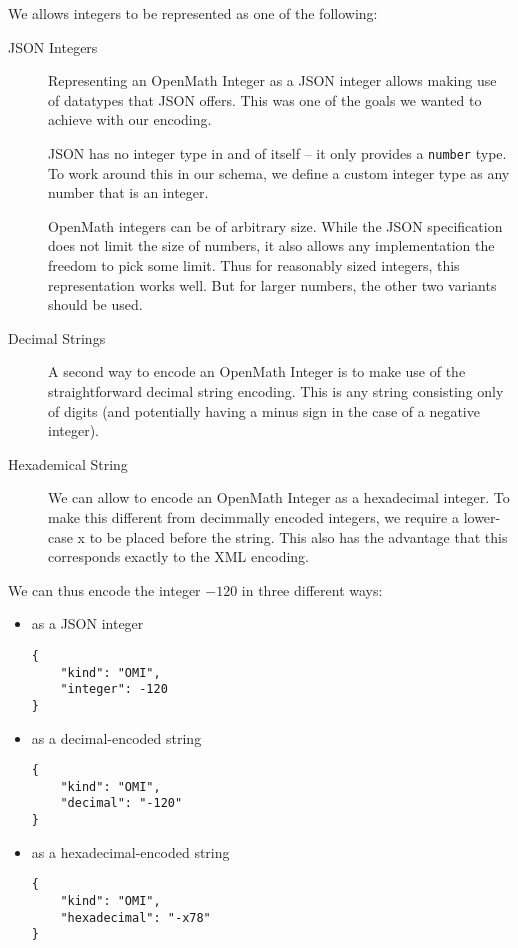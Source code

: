 We allows integers to be represented as one of the following:
\begin{description}
    \item[JSON Integers]
    Representing an OpenMath Integer as a JSON integer allows making use of datatypes that JSON offers. 
    This was one of the goals we wanted to achieve with our encoding. 
    
    JSON has no integer type in and of itself -- it only provides a \texttt{number} type. 
    To work around this in our schema, we define a custom integer type as any number that is an integer. 
        
    OpenMath integers can be of arbitrary size. 
    While the JSON specification does not limit the size of numbers, it also allows any implementation the freedom to pick some limit. 
    Thus for reasonably sized integers, this representation works well. 
    But for larger numbers, the other two variants should be used. 

    \item[Decimal Strings]
    A second way to encode an OpenMath Integer is to make use of the straightforward decimal string encoding. 
    This is any string consisting only of digits (and potentially having a minus sign in the case of a negative integer). 

    \item[Hexademical String]
    We can allow to encode an OpenMath Integer as a hexadecimal integer. 
    To make this different from decimmally encoded integers, we require a lower-case x to be placed before the string. 
    This also has the advantage that this corresponds exactly to the XML encoding.     
\end{description}

We can thus encode the integer $-120$ in three different ways:
\begin{itemize}
    \item as a JSON integer
\begin{lstlisting}
{
    "kind": "OMI",
    "integer": -120
}
\end{lstlisting}
    \item as a decimal-encoded string
\begin{lstlisting}
{
    "kind": "OMI",
    "decimal": "-120"
}
\end{lstlisting}
    \item as a hexadecimal-encoded string
\begin{lstlisting}
{
    "kind": "OMI",
    "hexadecimal": "-x78"
}
\end{lstlisting}
\end{itemize}

